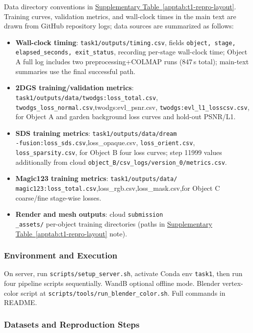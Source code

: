 \documentclass[10pt,twocolumn,letterpaper]{article}
\newcounter{apptab}
\newcommand{\apptabref}[1]{\hyperref[#1]{Supplementary Table~\ref*{#1}}}
\begin{document}
Data directory conventions in \apptabref{apptab:t1-repro-layout}. Training curves, validation metrics, and wall-clock times in the main text are drawn from GitHub repository logs; data sources are summarized as follows:
\begin{itemize}[nosep,leftmargin=*]
  \item \textbf{Wall-clock timing}: \texttt{task1/outputs/timing.csv}, fields \texttt{object, stage, elapsed\_seconds, exit\_status}, recording per-stage wall-clock time; Object A full log includes two preprocessing+COLMAP runs (847\,s total); main-text summaries use the final successful path.
  \item \textbf{2DGS training/validation metrics}:\\ \texttt{task1/outputs/data/twodgs:loss\_total.csv}, \texttt{twodgs\_loss\_normal.csv},twodgs:evl\_psnr.csv, \texttt{twodgs:evl\_l1\_losscsv.csv}, for Object A and garden background loss curves and hold-out PSNR/L1.
  \item \textbf{SDS training metrics}: \texttt{task1/outputs/data/dream\\-fusion:loss\_sds.csv},loss\_opaque.csv, \texttt{loss\_orient.csv}, \texttt{loss\_sparsity.csv}, for Object B four loss curves; step 11999 values additionally from cloud \texttt{object\_B/csv\_logs/version\_0/metrics.csv}.
  \item \textbf{Magic123 training metrics}: \texttt{task1/outputs/data/\\magic123:loss\_total.csv},loss\_rgb.csv,loss\_mask.csv,for Object C coarse/fine stage-wise losses.
  \item \textbf{Render and mesh outputs}: cloud \texttt{submission\\\_assets/} per-object training directories (paths in \apptabref{apptab:t1-repro-layout} note).
\end{itemize}

\subsubsection{Environment and Execution}

On server, run \texttt{scripts/setup\_server.sh}, activate Conda env \texttt{task1}, then run four pipeline scripts sequentially. WandB optional offline mode. Blender vertex-color script at \texttt{scripts/tools/run\_blender\_color.sh}. Full commands in README.

\subsubsection{Datasets and Reproduction Steps}
\end{document}
